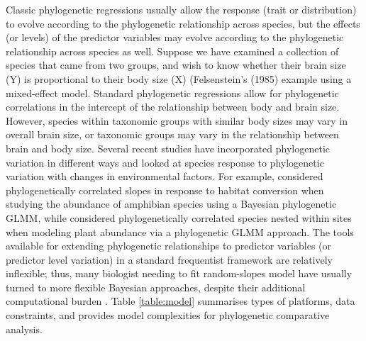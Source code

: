 \documentclass[12pt]{article}
\begin{document}
% 

Classic phylogenetic regressions usually allow the response (trait or distribution) to evolve according to the phylogenetic relationship across species, but the effects (or levels) of the predictor variables may evolve according to the phylogenetic relationship across species as well.
Suppose we have examined a collection of species that came from two groups, and wish to know whether their brain size (Y) is proportional to their body size (X) (Felsenstein's (1985) example using a mixed-effect model. 
Standard phylogenetic regressions allow for phylogenetic correlations in the intercept of the relationship between body and brain size. 
However, species within taxonomic groups with similar body sizes may vary in overall brain size, or taxonomic groups may vary in the relationship between brain and body size. 
Several recent studies have incorporated phylogenetic variation in different ways and looked at species response to phylogenetic variation with changes in environmental factors.
For example, \cite{nowakowski2018phylogenetic} considered phylogenetically correlated slopes in response to habitat conversion when studying the abundance of amphibian species using a Bayesian phylogenetic GLMM, while \cite{li2017canfun} considered phylogenetically correlated species nested within sites when modeling plant abundance via a phylogenetic GLMM approach. 
The tools available for extending phylogenetic relationships to predictor variables (or predictor level variation) in a standard frequentist framework are relatively inflexible; thus, many biologist needing to fit random-slopes model have usually turned to more flexible Bayesian approaches, despite their additional computational burden \citep{hadfield2010mcmc, burkner2018brms}.
Table \ref{table:model} summarises types of platforms, data constraints, and provides model complexities for phylogenetic comparative analysis.
\end{document}

